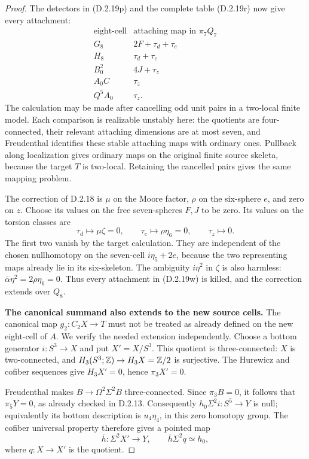 \begin{proof}
The detectors in \textup{(D.2.19p)} and the complete
table \textup{(D.2.19r)} now give every attachment:
\[
\begin{array}{c|c}
 \text{eight-cell}&\text{attaching map in }\pi_7Q_7\\ \hline
 G_8&2F+\tau_d+\tau_e\\
 H_8&\tau_d+\tau_e\\
 B_0^2&4J+\tau_z\\
 A_0C&\tau_z\\
 Q^5A_0&\tau_z.
\end{array}
 \tag{D.2.19w}
\]
The calculation may be made after cancelling odd unit
pairs in a two-local finite model. Each comparison is
realizable unstably here: the quotients are four-connected,
their relevant attaching dimensions are at most seven,
and Freudenthal identifies these stable attaching maps
with ordinary ones. Pullback along localization gives
ordinary maps on the original finite source skeleta,
because the target $T$ is two-local. Retaining the
cancelled pairs gives the same mapping problem.

The correction of D.2.18 is $\mu$ on the Moore
factor, $\rho$ on the six-sphere $e$, and zero on
$z$. Choose its values on the free seven-spheres
$F,J$ to be zero. Its values on the torsion classes are
\[
 \tau_d\longmapsto\mu\zeta=0,\qquad
 \tau_e\longmapsto\rho\eta_6=0,\qquad
 \tau_z\longmapsto0.
 \tag{D.2.19x}
\]
The first two vanish by the target calculation.
They are independent of the chosen nullhomotopy on
the seven-cell $i\eta_5+2e$, because the two
representing maps already lie in its six-skeleton.
The ambiguity $i\eta^2$ in $\zeta$ is also harmless:
$\overline\alpha\eta^2=2\rho\eta_6=0$.
Thus every attachment in \textup{(D.2.19w)} is killed,
and the correction extends over $Q_8$.

\medskip\noindent
\textbf{The canonical summand also extends to the new source cells.}
The canonical map $g_2:C_2X\to T$ must not be treated
as already defined on the new eight-cell of $A$.
We verify the needed extension independently.
Choose a bottom generator $i:S^3\to X$ and put
$X'=X/S^3$. This quotient is three-connected:
$X$ is two-connected, and
$H_3(S^3;\mathbb Z)\to H_3X=\mathbb Z/2$ is surjective.
The Hurewicz and cofiber sequences give
$H_3X'=0$, hence $\pi_3X'=0$.

Freudenthal makes $B\to\Omega^2\Sigma^2B$
three-connected. Since $\pi_3B=0$, it follows that
$\pi_5Y=0$, as already checked in D.2.13.
Consequently
$h_0\Sigma^2i:S^5\to Y$ is null; equivalently
its bottom description is $u_4\eta_4$, in this
zero homotopy group. The cofiber universal property
therefore gives a pointed map
\[
 \overline h:\Sigma^2X'\longrightarrow Y,
 \qquad \overline h\Sigma^2q\simeq h_0,
 \tag{D.2.19y}
\]
where $q:X\to X'$ is the quotient.


\end{proof}
